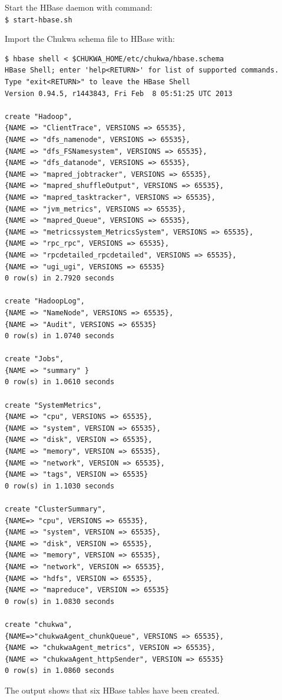 Start the HBase daemon with command: \\
\verb|$ start-hbase.sh|

Import the Chukwa schema file to HBase with: \\

\begin{verbatim}
$ hbase shell < $CHUKWA_HOME/etc/chukwa/hbase.schema
HBase Shell; enter 'help<RETURN>' for list of supported commands.
Type "exit<RETURN>" to leave the HBase Shell
Version 0.94.5, r1443843, Fri Feb  8 05:51:25 UTC 2013

create "Hadoop",
{NAME => "ClientTrace", VERSIONS => 65535},
{NAME => "dfs_namenode", VERSIONS => 65535},
{NAME => "dfs_FSNamesystem", VERSIONS => 65535},
{NAME => "dfs_datanode", VERSIONS => 65535},
{NAME => "mapred_jobtracker", VERSIONS => 65535},
{NAME => "mapred_shuffleOutput", VERSIONS => 65535},
{NAME => "mapred_tasktracker", VERSIONS => 65535},
{NAME => "jvm_metrics", VERSIONS => 65535},
{NAME => "mapred_Queue", VERSIONS => 65535},
{NAME => "metricssystem_MetricsSystem", VERSIONS => 65535},
{NAME => "rpc_rpc", VERSIONS => 65535},
{NAME => "rpcdetailed_rpcdetailed", VERSIONS => 65535},
{NAME => "ugi_ugi", VERSIONS => 65535}
0 row(s) in 2.7920 seconds

create "HadoopLog",
{NAME => "NameNode", VERSIONS => 65535},
{NAME => "Audit", VERSIONS => 65535}
0 row(s) in 1.0740 seconds

create "Jobs",
{NAME => "summary" }
0 row(s) in 1.0610 seconds

create "SystemMetrics",
{NAME => "cpu", VERSIONS => 65535},
{NAME => "system", VERSION => 65535},
{NAME => "disk", VERSION => 65535},
{NAME => "memory", VERSION => 65535},
{NAME => "network", VERSION => 65535},
{NAME => "tags", VERSION => 65535}
0 row(s) in 1.1030 seconds

create "ClusterSummary",
{NAME=> "cpu", VERSIONS => 65535},
{NAME => "system", VERSION => 65535},
{NAME => "disk", VERSION => 65535},
{NAME => "memory", VERSION => 65535},
{NAME => "network", VERSION => 65535},
{NAME => "hdfs", VERSION => 65535},
{NAME => "mapreduce", VERSION => 65535}
0 row(s) in 1.0830 seconds

create "chukwa",
{NAME=>"chukwaAgent_chunkQueue", VERSIONS => 65535},
{NAME => "chukwaAgent_metrics", VERSION => 65535},
{NAME => "chukwaAgent_httpSender", VERSION => 65535}
0 row(s) in 1.0860 seconds
\end{verbatim}

The output shows that six HBase tables have been created.

